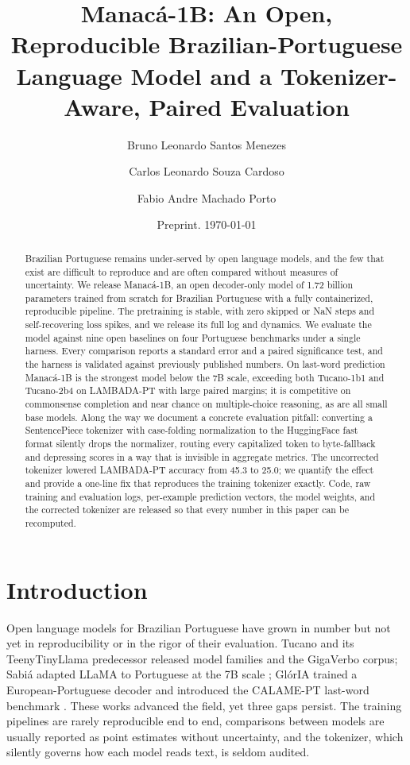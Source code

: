 \documentclass[11pt]{article}
\title{\bfseries Manac\'a-1B: An Open, Reproducible Brazilian-Portuguese\\
Language Model and a Tokenizer-Aware, Paired Evaluation}
\author[1]{Bruno Leonardo Santos Menezes}
\author[1]{Carlos Leonardo Souza Cardoso}
\author[1]{Fabio Andre Machado Porto}
\affil[1]{Laborat\'orio Nacional de Computa\c{c}\~ao Cient\'ifica (LNCC),
Petr\'opolis, Brazil\\ \texttt{\{brunolsm, cardoso, fporto\}@lncc.br}}
\date{Preprint. \today}
\begin{document}
\maketitle

\begin{abstract}
\noindent
Brazilian Portuguese remains under-served by open language models, and the few
that exist are difficult to reproduce and are often compared without measures of
uncertainty. We release Manac\'a-1B, an open decoder-only model of 1.72 billion
parameters trained from scratch for Brazilian Portuguese with a fully
containerized, reproducible pipeline. The pretraining is stable, with zero skipped
or NaN steps and self-recovering loss spikes, and we release its full log and
dynamics. We evaluate the model against nine open baselines on four Portuguese
benchmarks under a single harness. Every comparison
reports a standard error and a paired significance test, and the harness is
validated against previously published numbers. On last-word prediction Manac\'a-1B
is the strongest model below the 7B scale, exceeding both Tucano-1b1 and Tucano-2b4
on LAMBADA-PT with large paired margins; it is competitive on commonsense
completion and near chance on multiple-choice reasoning, as are all small base
models. Along the way we document a concrete evaluation pitfall: converting a
SentencePiece tokenizer with case-folding normalization to the HuggingFace fast
format silently drops the normalizer, routing every capitalized token to
byte-fallback and depressing scores in a way that is invisible in aggregate
metrics. The uncorrected tokenizer lowered LAMBADA-PT accuracy from 45.3 to 25.0;
we quantify the effect and provide a one-line fix that reproduces the training
tokenizer exactly. Code, raw training and evaluation logs, per-example prediction
vectors, the model weights, and the corrected tokenizer are released so that every
number in this paper can be recomputed.
\end{abstract}

\section{Introduction}

Open language models for Brazilian Portuguese have grown in number but not yet in
reproducibility or in the rigor of their evaluation. Tucano \cite{tucano} and its
TeenyTinyLlama predecessor \cite{ttl} released model families and the GigaVerbo
corpus; Sabi\'a adapted LLaMA to Portuguese at the 7B scale \cite{sabia}; Gl\'orIA
trained a European-Portuguese decoder and introduced the CALAME-PT last-word
benchmark \cite{gloria}. These works advanced the field, yet three gaps persist.
The training pipelines are rarely reproducible end to end, comparisons between
models are usually reported as point estimates without uncertainty, and the
tokenizer, which silently governs how each model reads text, is seldom audited.
\end{document}
